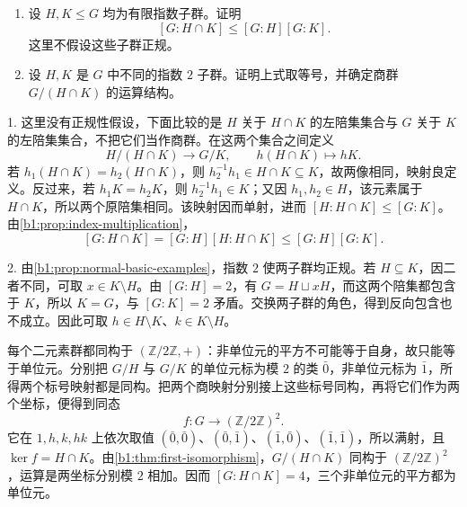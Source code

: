 \begin{exercise}\label{b1:ex:02-two-index-two}
	\begin{enumerate}
		\item 设 \(H,K\leq G\) 均为有限指数子群。证明
			\[
				[G:H\cap K]\leq[G:H][G:K].
			\]
			这里不假设这些子群正规。
		\item 设 \(H,K\) 是 \(G\) 中不同的指数 \(2\) 子群。证明上式取等号，并确定商群 \(G/(H\cap K)\) 的运算结构。
	\end{enumerate}
\end{exercise}
\begin{solution}
	1. 这里没有正规性假设，下面比较的是 \(H\) 关于 \(H\cap K\) 的左陪集集合与 \(G\) 关于 \(K\) 的左陪集集合，不把它们当作商群。在这两个集合之间定义
	\[
		H/(H\cap K)\longrightarrow G/K, \qquad h(H\cap K)\longmapsto hK.
	\]
	若 \(h_1(H\cap K)=h_2(H\cap K)\)，则 \(h_2^{-1}h_1\in H\cap K\subseteq K\)，故两像相同，映射良定义。反过来，若 \(h_1K=h_2K\)，则 \(h_2^{-1}h_1\in K\)；又因 \(h_1,h_2\in H\)，该元素属于 \(H\cap K\)，所以两个原陪集相同。该映射因而单射，进而 \([H:H\cap K]\leq[G:K]\)。由\cref{b1:prop:index-multiplication}，
	\[
		[G:H\cap K]=[G:H][H:H\cap K] \leq[G:H][G:K].
	\]

	2. 由\cref{b1:prop:normal-basic-examples}，指数 \(2\) 使两子群均正规。若 \(H\subseteq K\)，因二者不同，可取 \(x\in K\setminus H\)。由 \([G:H]=2\)，有 \(G=H\sqcup xH\)，而这两个陪集都包含于 \(K\)，所以 \(K=G\)，与 \([G:K]=2\) 矛盾。交换两子群的角色，得到反向包含也不成立。因此可取 \(h\in H\setminus K\)、\(k\in K\setminus H\)。

	每个二元素群都同构于 \((\mathbb Z/2\mathbb Z,+)\)：非单位元的平方不可能等于自身，故只能等于单位元。分别把 \(G/H\) 与 \(G/K\) 的单位元标为模 \(2\) 的类 \(\bar0\)，非单位元标为 \(\bar1\)，所得两个标号映射都是同构。把两个商映射分别接上这些标号同构，再将它们作为两个坐标，便得到同态
	\[
		f:G\longrightarrow(\mathbb Z/2\mathbb Z)^2.
	\]
	它在 \(1,h,k,hk\) 上依次取值 \((\bar0,\bar0)\)、\((\bar0,\bar1)\)、\((\bar1,\bar0)\)、\((\bar1,\bar1)\)，所以满射，且 \(\ker f=H\cap K\)。由\cref{b1:thm:first-isomorphism}，\(G/(H\cap K)\) 同构于 \((\mathbb Z/2\mathbb Z)^2\)，运算是两坐标分别模 \(2\) 相加。因而 \([G:H\cap K]=4\)，三个非单位元的平方都为单位元。
\end{solution}

